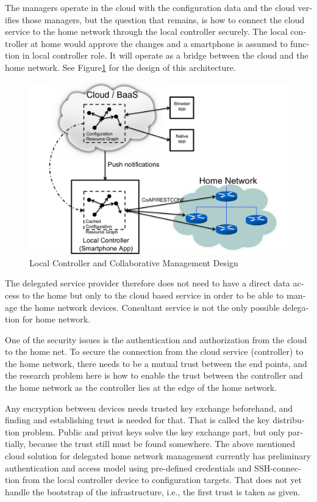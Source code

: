 \documentclass[12pt,a4paper,english]{tutthesis}
\begin{document}
\begin{otherlanguage}{english}
The managers operate in the cloud with the configuration data and the
cloud verifies those managers,
but the question that remains, is how to connect the cloud service to the home network
through the local controller securely. The local controller at home
would approve the changes and a smartphone is assumed to function in
local controller role. It will operate as a bridge between the cloud and the home network.
See Figure\ref{fig:localcontroller} for the design of this architecture.

\begin{figure}[htb]
\centering
\includegraphics[width=.9\linewidth]{localcontroller.png}
\caption{\label{fig:localcontroller}Local Controller and Collaborative Management Design}
\end{figure}



The delegated service provider therefore does not need to have a direct data
access to the home but only to the cloud based service in order to be able to
manage the home network devices.
Consultant service is not the only possible delegation for home network.








One of the security issues is the authentication and authorization 
from the cloud to the home net.
To secure the connection from the cloud service (controller)
to the home network, there needs to be a mutual trust between the end
points, and the research problem here is how to enable the trust between the
controller and the home network as the controller lies at the edge of the
home network.


Any encryption between devices needs trusted key exchange beforehand,
and finding and establishing trust is needed for that.  That is called
the key distribution problem. Public and privat keys solve the key exchange part, but
only partially, because the trust still must be found somewhere.
The above mentioned cloud solution for delegated home network
management currently has preliminary authentication and access model
using pre-defined credentials and SSH-connection from the local
controller device to configuration
targets\cite[Chap.4]{silverajan2015collaborative}.
That does not yet handle the bootstrap of the infrastructure, 
i.e., the first trust is taken as given. 


\end{otherlanguage}
\end{document}
